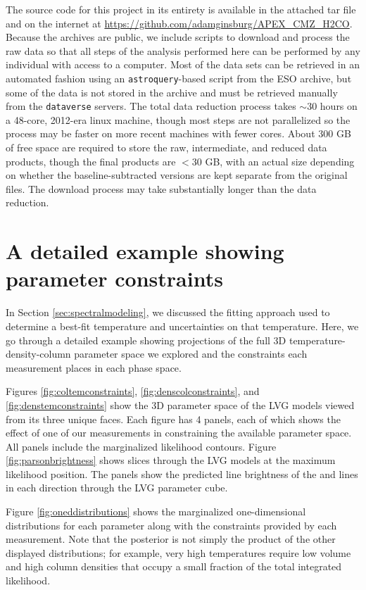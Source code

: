 The source code for this project in its entirety is available in the attached
tar file and on the internet at
\url{https://github.com/adamginsburg/APEX_CMZ_H2CO}.
Because the archives are public, we include scripts to download and process the
raw data so that all steps of the analysis performed here can be performed by
any individual with access to a computer.  Most of the data sets can be retrieved
in an automated fashion using an \texttt{astroquery}-based script from the ESO archive,
but some of the data is not stored in the archive and must be retrieved manually from the
\texttt{dataverse} servers. The total data reduction process
takes $\sim30$ hours on a 48-core, 2012-era linux machine, though most steps
are not parallelized so the process may be faster on more recent machines with
fewer cores.  About 300 GB of free space are required to store the raw,
intermediate, and reduced data products, though the final products are $<30$
GB, with an actual size depending on whether the baseline-subtracted versions
are kept separate from the original files.  The download process may take
substantially longer than the data reduction.


\section{A detailed example showing parameter constraints}
In Section \ref{sec:spectralmodeling}, we discussed the fitting approach used
to determine a best-fit temperature and uncertainties on that temperature.
Here, we go through a detailed example showing projections of the full 3D
temperature-density-column parameter space we explored and the constraints
each measurement places in each phase space.

Figures \ref{fig:coltemconstraints}, \ref{fig:denscolconstraints}, and
\ref{fig:denstemconstraints} show the 3D parameter space of the LVG models
viewed from its three unique faces.  Each figure has 4 panels, each of which
shows the effect of one of our measurements in constraining the available
parameter space.  All panels include the marginalized likelihood contours.
Figure \ref{fig:parsonbrightness} shows slices through the LVG models at the
maximum likelihood position.  The panels show the predicted line brightness of
the \threeohthree and \threetwoone lines in each direction through the LVG
parameter cube.

Figure \ref{fig:oneddistributions} shows the marginalized one-dimensional
distributions for each parameter along with the constraints provided by each
measurement.  Note that the posterior is not simply the product of the other
displayed distributions; for example, very high temperatures require low
volume and high column densities that occupy a small fraction of the total
integrated likelihood.

